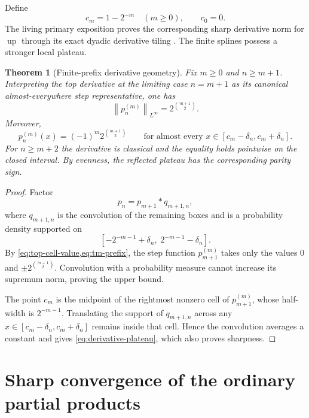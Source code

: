 \documentclass[11pt]{article}
\newtheorem{theorem}{Theorem}[section]
\theoremstyle{definition}
\theoremstyle{remark}
\newcommand{\Up}{\operatorname{up}}
\newcommand{\norm}[1]{\left\lVert #1\right\rVert}
\begin{document}
Define
\begin{equation}
 c_m=1-2^{-m}\quad(m\ge0),
 \qquad c_0=0.
 \label{eq:cm}
\end{equation}
The living primary exposition proves the corresponding sharp derivative norm for
$\Up$ through its exact dyadic derivative tiling \cite{proveit-primary}.  The finite
splines possess a stronger local plateau.

\begin{theorem}[Finite-prefix derivative geometry]
\label{thm:derivative-plateau}
Fix $m\ge0$ and $n\ge m+1$.  Interpreting the top derivative at the limiting case
$n=m+1$ as its canonical almost-everywhere step representative, one has
\begin{equation}
 \norm{p_n^{(m)}}_{L^\infty}=2^{\binom{m+1}{2}}.
 \label{eq:pn-derivative-norm}
\end{equation}
Moreover,
\begin{equation}
 p_n^{(m)}(x)=(-1)^m2^{\binom{m+1}{2}}
 \qquad
 \text{for almost every }x\in[c_m-\delta_n,c_m+\delta_n].
 \label{eq:derivative-plateau}
\end{equation}
For $n\ge m+2$ the derivative is classical and the equality holds pointwise on the
closed interval.  By evenness, the reflected plateau has the corresponding parity sign.
\end{theorem}

\begin{proof}
Factor
\[
 p_n=p_{m+1}*q_{m+1,n},
\]
where $q_{m+1,n}$ is the convolution of the remaining boxes and is a probability
density supported on
\[
 \left[-2^{-m-1}+\delta_n,\;2^{-m-1}-\delta_n\right].
\]
By \cref{eq:top-cell-value,eq:tm-prefix}, the step function
$p_{m+1}^{(m)}$ takes only the values
$0$ and $\pm2^{\binom{m+1}{2}}$.  Convolution with a probability measure cannot
increase its supremum norm, proving the upper bound.

The point $c_m$ is the midpoint of the rightmost nonzero cell of
$p_{m+1}^{(m)}$, whose half-width is $2^{-m-1}$.  Translating the support of
$q_{m+1,n}$ across any $x\in[c_m-\delta_n,c_m+\delta_n]$ remains inside that cell.
Hence the convolution averages a constant and gives \cref{eq:derivative-plateau},
which also proves sharpness.
\end{proof}

\section{Sharp convergence of the ordinary partial products}
\label{sec:sharp-convergence}
\end{document}
